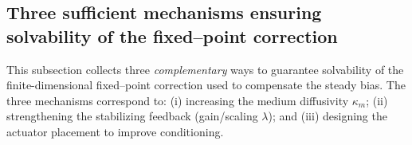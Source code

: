 \documentclass[11pt,a4paper]{article}
\numberwithin{equation}{section}
\theoremstyle{definition}
\newcommand{\1}{\mathbbm{1}}
\begin{document}
\subsection{Three sufficient mechanisms ensuring solvability of the fixed--point correction}
\label{subsec:fp-solvability-mechanisms}
\noindent
This subsection collects three \emph{complementary} ways to guarantee solvability of the finite-dimensional
fixed--point correction used to compensate the steady bias. The three mechanisms correspond to:
(i) increasing the medium diffusivity $\kappa_m$; (ii) strengthening the stabilizing feedback (gain/scaling $\lambda$);
and (iii) designing the actuator placement to improve conditioning.

\end{document}
